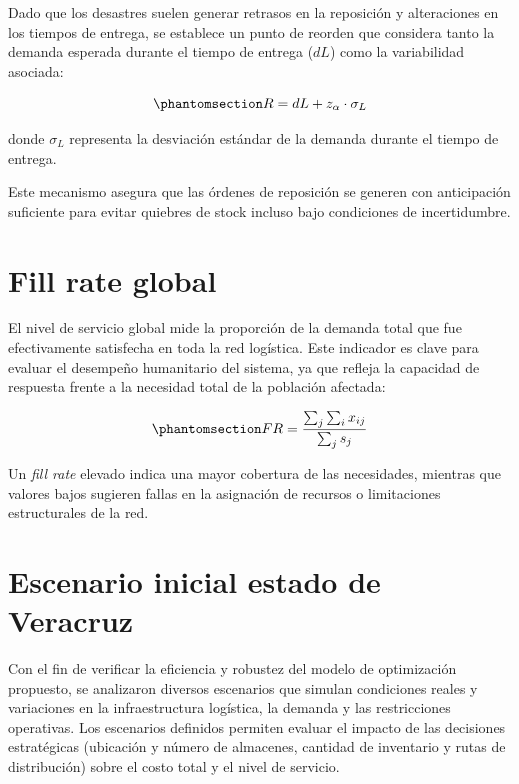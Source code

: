 \documentclass[
  spanish,
  us-letterpaper,
]{scrreprt}
\numberwithin{equation}{chapter} %
\begin{document}
Dado que los desastres suelen generar retrasos en la reposición y
alteraciones en los tiempos de entrega, se establece un punto de reorden
que considera tanto la demanda esperada durante el tiempo de entrega
(\(dL\)) como la variabilidad asociada:

\begin{equation}\phantomsection\label{eq-PBHE_completa}{
R = dL + z_{\alpha} \cdot \sigma_L 
}\end{equation}

donde \(\sigma_L\) representa la desviación estándar de la demanda
durante el tiempo de entrega.

Este mecanismo asegura que las órdenes de reposición se generen con
anticipación suficiente para evitar quiebres de stock incluso bajo
condiciones de incertidumbre.

\section{Fill rate global}\label{fill-rate-global}

El nivel de servicio global mide la proporción de la demanda total que
fue efectivamente satisfecha en toda la red logística. Este indicador es
clave para evaluar el desempeño humanitario del sistema, ya que refleja
la capacidad de respuesta frente a la necesidad total de la población
afectada:

\begin{equation}\phantomsection\label{eq-PBHE_completa}{
FR = \frac{\sum_{j} \sum_i x_{ij}}{\sum_j s_j} 
}\end{equation}

Un \emph{fill rate} elevado indica una mayor cobertura de las
necesidades, mientras que valores bajos sugieren fallas en la asignación
de recursos o limitaciones estructurales de la red.

\section{Escenario inicial estado de
Veracruz}\label{escenario-inicial-estado-de-veracruz}

Con el fin de verificar la eficiencia y robustez del modelo de
optimización propuesto, se analizaron diversos escenarios que simulan
condiciones reales y variaciones en la infraestructura logística, la
demanda y las restricciones operativas. Los escenarios definidos
permiten evaluar el impacto de las decisiones estratégicas (ubicación y
número de almacenes, cantidad de inventario y rutas de distribución)
sobre el costo total y el nivel de servicio.
\end{document}
